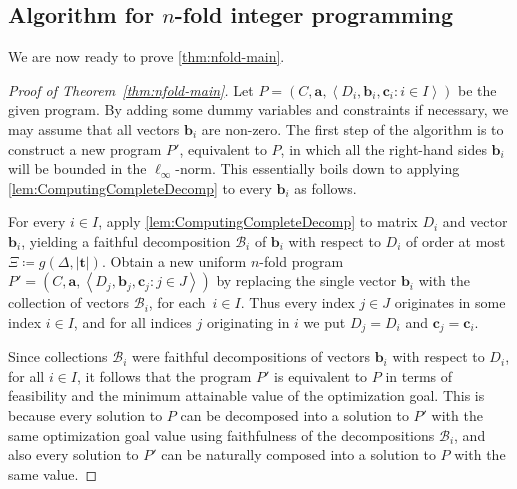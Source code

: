 \documentclass{theoretics}
\newcommand{\Bb}{\mathcal{B}}
\newcommand{\tup}[1]{{\mathbf{#1}}}
\newcommand{\tv}{\tup t}
\newcommand{\av}{\tup a}
\newcommand{\bb}{\tup b}
\newcommand{\cc}{\tup c}
\newcommand{\mset}[1]{\left\langle #1\right\rangle}
\begin{document}
\subsection{Algorithm for \texorpdfstring{$n$}{n}-fold integer programming}

We are now ready to prove \cref{thm:nfold-main}.

\begin{proof}[Proof of Theorem~\ref{thm:nfold-main}]
Let $P=(C,\av,\mset{D_i,\bb_i,\cc_i\colon i\in I})$ be the given program. By adding some dummy variables and constraints if necessary, we may assume that all vectors $\bb_i$ are non-zero. The first step of the algorithm is to construct a new program $P'$, equivalent to $P$, in which all the right-hand sides $\bb_i$ will be bounded in the $\ell_\infty$-norm. This essentially boils down to applying \cref{lem:ComputingCompleteDecomp} to every $\bb_i$ as follows.

For every $i\in I$, apply \cref{lem:ComputingCompleteDecomp} to matrix $D_i$ and vector $\bb_i$, yielding a faithful decomposition $\Bb_i$ of $\bb_i$ with respect to $D_i$ of order at most $\Xi\coloneqq g(\Delta,|\tv|)$. Obtain a new uniform $n$-fold program $P'=(C,\av,\mset{D_{j},\bb_{j},\cc_{j}\colon j\in J})$ by replacing the single vector $\bb_i$ with the collection of vectors $\Bb_i$, for each~$i\in I$. Thus every index $j\in J$ originates in some index $i\in I$, and for all indices $j$ originating in $i$ we put $D_{j}=D_i$ and $\cc_{j}=\cc_i$.

Since collections $\Bb_i$ were faithful decompositions of vectors $\bb_i$ with respect to $D_i$, for all $i\in I$, it follows that the program $P'$ is equivalent to $P$ in terms of feasibility and the minimum attainable value of the optimization goal. This is because every solution to $P$ can be decomposed into a solution to $P'$ with the same optimization goal value using faithfulness of the decompositions $\Bb_i$, and also every solution to $P'$ can be naturally composed into a solution to $P$ with the same value.


\end{proof}
\end{document}
